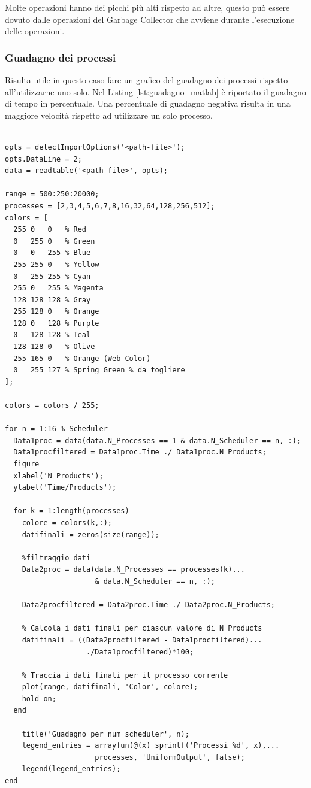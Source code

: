 Molte operazioni hanno dei picchi più alti rispetto ad altre,
questo può essere dovuto dalle operazioni del Garbage Collector
che avviene durante l'esecuzione delle operazioni.

\subsubsection{Guadagno dei processi}

Risulta utile in questo caso fare un grafico del guadagno dei
processi rispetto all'utilizzarne uno solo. Nel Listing \ref{lst:guadagno_matlab}
è riportato il guadagno di tempo in percentuale. Una percentuale di
guadagno negativa risulta in una maggiore velocità rispetto ad utilizzare un
solo processo.

\begin{lstlisting}[language=none,captionpos=b,
	caption={Guadagno rispetto ad un processo},label={lst:guadagno_matlab}]

opts = detectImportOptions('<path-file>');
opts.DataLine = 2;
data = readtable('<path-file>', opts);

range = 500:250:20000;
processes = [2,3,4,5,6,7,8,16,32,64,128,256,512];
colors = [
  255 0   0   % Red
  0   255 0   % Green
  0   0   255 % Blue
  255 255 0   % Yellow
  0   255 255 % Cyan
  255 0   255 % Magenta
  128 128 128 % Gray
  255 128 0   % Orange
  128 0   128 % Purple
  0   128 128 % Teal
  128 128 0   % Olive
  255 165 0   % Orange (Web Color)
  0   255 127 % Spring Green % da togliere
];

colors = colors / 255;

for n = 1:16 % Scheduler
  Data1proc = data(data.N_Processes == 1 & data.N_Scheduler == n, :);
  Data1procfiltered = Data1proc.Time ./ Data1proc.N_Products;
  figure
  xlabel('N_Products');
  ylabel('Time/Products');

  for k = 1:length(processes)
    colore = colors(k,:);
    datifinali = zeros(size(range));

    %filtraggio dati
    Data2proc = data(data.N_Processes == processes(k)... 
	                 & data.N_Scheduler == n, :);

    Data2procfiltered = Data2proc.Time ./ Data2proc.N_Products;  

    % Calcola i dati finali per ciascun valore di N_Products  
    datifinali = ((Data2procfiltered - Data1procfiltered)... 
	               ./Data1procfiltered)*100;

    % Traccia i dati finali per il processo corrente
    plot(range, datifinali, 'Color', colore);
    hold on;
  end

	title('Guadagno per num scheduler', n);
	legend_entries = arrayfun(@(x) sprintf('Processi %d', x),... 
                     processes, 'UniformOutput', false);
	legend(legend_entries);
end


\end{lstlisting}


